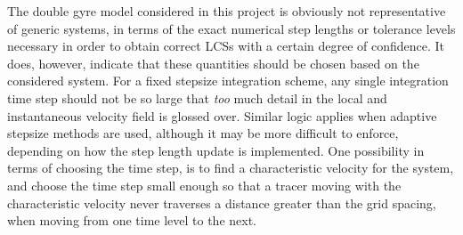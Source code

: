 %
%
The double gyre model considered in this project is obviously not representative
of generic systems, in terms of the exact numerical step lengths or tolerance
levels necessary in order to obtain correct LCSs with a certain
degree of confidence. It does, however, indicate that these quantities should
be chosen based on the considered system. For a fixed stepsize integration
scheme, any single integration time step should not be so large that \emph{too}
much detail in the local and instantaneous velocity field is glossed over.
Similar logic applies when adaptive stepsize methods are used, although it
may be more difficult to enforce, depending on how the step length
update is implemented. One possibility in terms of choosing the time step, is to
find a characteristic velocity for the system, and choose the time step small
enough so that a tracer moving with the characteristic velocity never traverses
a distance greater than the grid spacing, when moving from one time level to
the next.

